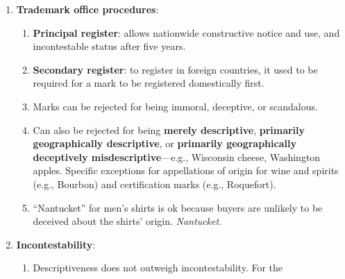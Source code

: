 \begin{enumerate}
\begin{enumerate}
\begin{enumerate}
            registered with a bona fide intent to use in 
            commerce.\footnote{Casebook p. 828.}
            \item Knowledge that another person plans to use a mark does not 
            prevent you from using it. However, the \textbf{intent to use} 
            rule lets someone ``reserve'' a mark if it is actually used within 
            six months (extendable to up to three years for good cause). \S\ 
            1051(b), Lanham \S\ 1(b). \emph{Zazu}.
            \item Registration establishes national priority. For unregistered 
            marks, concurrent users can expand their geographic areas unless 
            it causes confusion.
            \item Two types of \textbf{concurrent use}: (1) different products 
            in the same market, (2) different geographic markets.
        \end{enumerate}
        \item \textbf{Trademark office procedures}:
        \begin{enumerate}
            \item \textbf{Principal register}: allows nationwide constructive 
            notice and use, and incontestable status after five years.
            \item \textbf{Secondary register}: to register in foreign 
            countries, it used to be required for a mark to be registered 
            domestically first.
            \item Marks can be rejected for being immoral, deceptive, or 
            scandalous.
            \item Can also be rejected for being \textbf{merely descriptive}, 
            \textbf{primarily geographically descriptive}, or 
            \textbf{primarily geographically deceptively 
            misdescriptive}---e.g., Wisconsin cheese, Washington apples. 
            Specific exceptions for appellations of origin for wine and 
            spirits (e.g., Bourbon) and certification marks (e.g., Roquefort).
            \item ``Nantucket'' for men's shirts is ok because buyers are 
            unlikely to be deceived about the shirts' origin. 
            \emph{Nantucket}.
        \end{enumerate}
        \item \textbf{Incontestability}:
        \begin{enumerate}
            \item Descriptiveness does not outweigh incontestability. For the 

\end{enumerate}
\end{enumerate}
\end{enumerate}
